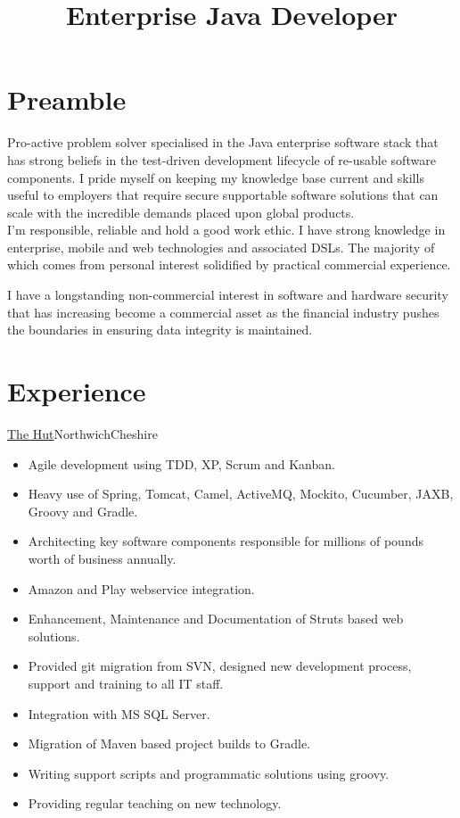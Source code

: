 \documentclass[a4paper,10pt]{moderncv}
\title{Enterprise Java Developer}
\newcommand\weblink[2] {{\color{href} \href{#1}{#2}}}
\begin{document}
\maketitle

\section{Preamble}
Pro-active problem solver specialised in the Java enterprise software stack that has strong beliefs in the test-driven development lifecycle of re-usable software components.
I pride myself on keeping my knowledge base current and skills useful to employers that require secure supportable software solutions that can scale with the incredible demands placed upon global products.\\

I'm responsible, reliable and hold a good work ethic.
I have strong knowledge in enterprise, mobile and web technologies and associated DSLs. The majority of which comes from personal interest solidified by practical commercial experience.

I have a longstanding non-commercial interest in software and hardware security that has increasing become a commercial asset as the financial industry pushes the boundaries in ensuring data integrity is maintained.

\section{Experience}

{\weblink{http://www.thehutgroup.com}{The Hut}}{Northwich}{Cheshire}{
\begin{itemize}
  \item Agile development using TDD, XP, Scrum and Kanban.
  \item Heavy use of Spring, Tomcat, Camel, ActiveMQ, Mockito, Cucumber, JAXB, Groovy and Gradle.
  \item Architecting key software components responsible for millions of pounds worth of business annually.
  \item Amazon and Play webservice integration.
  \item Enhancement, Maintenance and Documentation of Struts based web solutions.
  \item Provided git migration from SVN, designed new development process, support and training to all IT staff.
  \item Integration with MS SQL Server.
  \item Migration of Maven based project builds to Gradle.
  \item Writing support scripts and programmatic solutions using groovy.
  \item Providing regular teaching on new technology.
\end{itemize}
}
\end{document}
